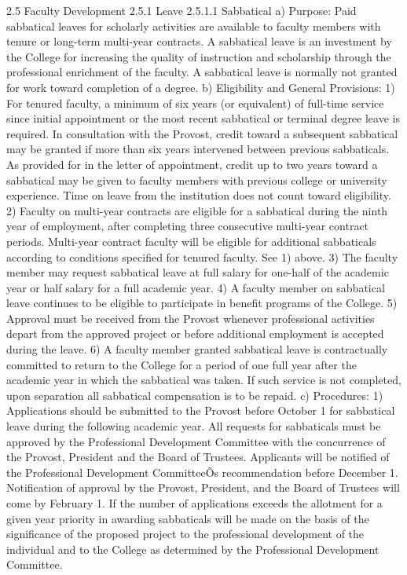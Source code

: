 \documentclass[letterpaper, 11pt]{article}
\begin{document}
	2.5 Faculty Development
	2.5.1 Leave
	2.5.1.1 Sabbatical
	a) Purpose: Paid sabbatical leaves for scholarly activities are available to faculty members with tenure or long-term multi-year contracts.  A sabbatical leave is an investment by the College for increasing the quality of instruction and scholarship through the professional enrichment of the faculty.  A sabbatical leave is normally not granted for work toward completion of a degree.
	b) Eligibility and General Provisions:
	1) For tenured faculty, a minimum of six years (or equivalent) of full-time service since initial appointment or the most recent sabbatical or terminal degree leave is required.  In consultation with the Provost, credit toward a subsequent sabbatical may be granted if more than six years intervened between previous sabbaticals.  As provided for in the letter of appointment, credit up to two years toward a sabbatical may be given to faculty members with previous college or university experience.  Time on leave from the institution does not count toward eligibility.
	2) Faculty on multi-year contracts are eligible for a sabbatical during the ninth year of employment, after completing three consecutive multi-year contract periods.  Multi-year contract faculty will be eligible for additional sabbaticals according to conditions specified for tenured faculty.  See 1) above.
	3) The faculty member may request sabbatical leave at full salary for one-half of the academic year or half salary for a full academic year.
	4) A faculty member on sabbatical leave continues to be eligible to participate in benefit programs of the College.
	5) Approval must be received from the Provost whenever professional activities depart from the approved project or before additional employment is accepted during the leave.
	6) A faculty member granted sabbatical leave is contractually committed to return to the College for a period of one full year after the academic year in which the sabbatical was taken.  If such service is not completed, upon separation all sabbatical compensation is to be repaid.
	c) Procedures:
	1) Applications should be submitted to the Provost before October 1 for sabbatical leave during the following academic year.  All requests for sabbaticals must be approved by the Professional Development Committee with the concurrence of the Provost, President and the Board of Trustees.  Applicants will be notified of the Professional Development CommitteeÕs recommendation before December 1.  Notification of approval by the Provost, President, and the Board of Trustees will come by February 1. If the number of applications exceeds the allotment for a given year priority in awarding sabbaticals will be made on the basis of the significance of the proposed project to the professional development of the individual and to the College as determined by the Professional Development Committee.
\end{document}
